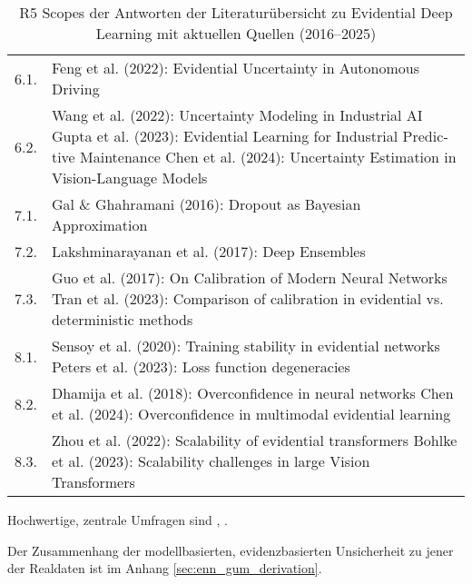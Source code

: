 \begin{otherlanguage}{ngerman}
\begin{table}[htbp]
\begin{tabularx}{\textwidth}{|l|X|}
6.1. & Feng et al. (2022): Evidential Uncertainty in Autonomous Driving \cite{feng2022review} \\ 
6.2. & Wang et al. (2022): Uncertainty Modeling in Industrial AI \cite{wang2022uncertainty} \newline
         Gupta et al. (2023): Evidential Learning for Industrial Predictive Maintenance \cite{gupta2023industrialedl} \newline
         Chen et al. (2024): Uncertainty Estimation in Vision-Language Models \cite{chen2024vlm} \\ \hline

7.1. & Gal \& Ghahramani (2016): Dropout as Bayesian Approximation \cite{gal2016dropout} \\ 
7.2. & Lakshminarayanan et al. (2017): Deep Ensembles \cite{lakshminarayanan2017simple} \\ 
7.3. & Guo et al. (2017): On Calibration of Modern Neural Networks \cite{guo2017calibration} \newline
         Tran et al. (2023): Comparison of calibration in evidential vs. deterministic methods \cite{tran2023separating} \\ \hline

8.1. & Sensoy et al. (2020): Training stability in evidential networks \cite{sensoy2020uncertainty} \newline
         Peters et al. (2023): Loss function degeneracies \cite{peters2023consistency} \\ 
8.2. & Dhamija et al. (2018): Overconfidence in neural networks \cite{dhamija2018reducing} \newline
         Chen et al. (2024): Overconfidence in multimodal evidential learning \cite{chen2024vlm} \\ 
8.3. & Zhou et al. (2022): Scalability of evidential transformers \cite{zhou2022evidential} \newline
         Bohlke et al. (2023): Scalability challenges in large Vision Transformers \cite{bohlke2023evidentialvit} \\ \hline

\end{tabularx}
\caption{R5 Scopes der Antworten der Literaturübersicht zu Evidential Deep Learning mit aktuellen Quellen (2016–2025)}
\label{tab:edl_scopes_sources_updated}
\end{table}

Hochwertige, zentrale Umfragen sind \parencite{Ulmer2023}, \parencite{Gawlikowski2023}. 

Der Zusammenhang der modellbasierten, evidenzbasierten Unsicherheit zu jener der Realdaten ist im Anhang \ref{sec:enn_gum_derivation}.


\end{otherlanguage}
